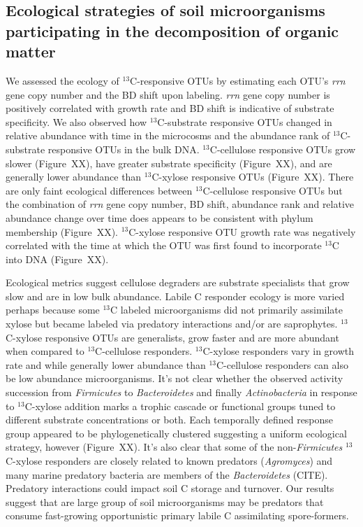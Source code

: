 \subsection{Ecological strategies of soil microorganisms participating in the
decomposition of organic matter}
We assessed the ecology of $^{13}$C-responsive OTUs by estimating each OTU's
\textit{rrn} gene copy number and the BD shift upon labeling. \textit{rrn} gene
copy number is positively correlated with growth rate and BD shift is
indicative of substrate specificity. We also observed how $^{13}$C-substrate
responsive OTUs changed in relative abundance with time in the microcosms and
the abundance rank of $^{13}$C-substrate responsive OTUs in the bulk DNA.
$^{13}$C-cellulose responsive OTUs grow slower (Figure~XX), have greater
substrate specificity (Figure~XX), and are generally lower abundance than
$^{13}$C-xylose responsive OTUs (Figure~XX). There are only faint ecological
differences between $^{13}$C-cellulose responsive OTUs but the combination of
\textit{rrn} gene copy number, BD shift, abundance rank and relative abundance
change over time does appears to be consistent with phylum membership
(Figure~XX). $^{13}$C-xylose responsive OTU growth rate was negatively
correlated with the time at which the OTU was first found to incorporate
$^{13}$C into DNA (Figure~XX).  

Ecological metrics suggest cellulose degraders are substrate specialists that
grow slow and are in low bulk abundance. Labile C responder ecology is more
varied perhaps because some $^{13}$C labeled microorganisms did not primarily
assimilate xylose but became labeled via predatory interactions and/or are
saprophytes. $^{13}$C-xylose responsive OTUs are generalists, grow faster and
are more abundant when compared to $^{13}$C-cellulose responders.
$^{13}$C-xylose responders vary in growth rate and while generally lower
abundance than $^{13}$C-cellulose responders can also be low abundance
microorganisms. It's not clear whether the observed activity succession from
\textit{Firmicutes} to \textit{Bacteroidetes} and finally
\textit{Actinobacteria} in response to $^{13}$C-xylose addition marks a trophic
cascade or functional groups tuned to different substrate concentrations or
both. Each temporally defined response group appeared to be phylogenetically
clustered suggesting a uniform ecological strategy, however (Figure~XX). It's
also clear that some of the non-\textit{Firmicutes} $^{13}$C-xylose responders
are closely related to known predators (\textit{Agromyces}) and many marine
predatory bacteria are members of the \textit{Bacteroidetes} (CITE). Predatory
interactions could impact soil C storage and turnover. Our results suggest that
are large group of soil microorganisms may be predators that consume
fast-growing opportunistic primary labile C assimilating spore-formers.

